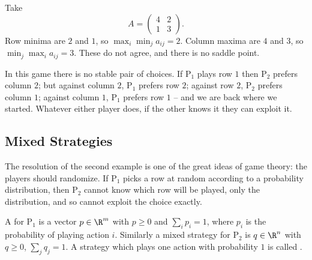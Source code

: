 \begin{example}
    Take
    $$
    A = \begin{pmatrix}4 & 2\\1&3\end{pmatrix}.
    $$
    Row minima are $2$ and $1$, so $\max_i\min_j a_{ij} = 2$. Column maxima are $4$ and $3$, so $\min_j\max_i a_{ij} = 3$. These do not agree, and there is no saddle point.

    In this game there is no stable pair of choices. If $\mathrm{P}_1$ plays row $1$ then $\mathrm{P}_2$ prefers column $2$; but against column $2$, $\mathrm{P}_1$ prefers row $2$; against row $2$, $\mathrm{P}_2$ prefers column $1$; against column $1$, $\mathrm{P}_1$ prefers row $1$ -- and we are back where we started. Whatever either player does, if the other knows it they can exploit it.
\end{example}

\subsection{Mixed Strategies}

The resolution of the second example is one of the great ideas of game theory: the players should randomize. If $\mathrm{P}_1$ picks a row at random according to a probability distribution, then $\mathrm{P}_2$ cannot know which row will be played, only the distribution, and so cannot exploit the choice exactly.

\begin{definition}
    A  for $\mathrm{P}_1$ is a vector $p \in \R^m$ with $p \geq 0$ and $\sum_i p_i = 1$, where $p_i$ is the probability of playing action $i$. Similarly a mixed strategy for $\mathrm{P}_2$ is $q \in \R^n$ with $q \geq 0$, $\sum_j q_j = 1$. A strategy which plays one action with probability $1$ is called .
\end{definition}

